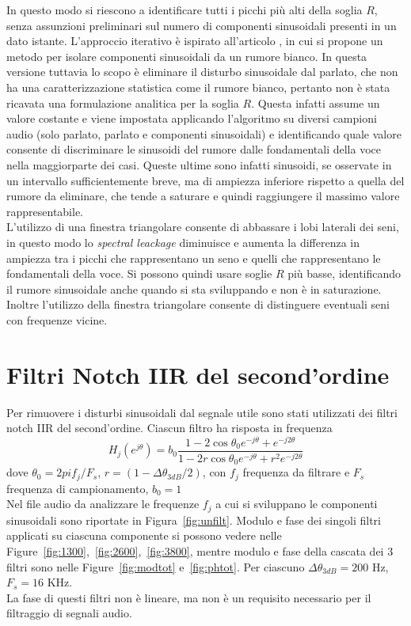 \documentclass[10pt,A4]{article}
\begin{document}
In questo modo si riescono a identificare tutti i picchi più alti della soglia $R$, senza assunzioni preliminari sul numero di componenti sinusoidali presenti in un dato istante. L'approccio iterativo è ispirato all'articolo \cite{iterative}, in cui si propone un metodo per isolare componenti sinusoidali da un rumore bianco. In questa versione tuttavia lo scopo è eliminare il disturbo sinusoidale dal parlato, che non ha una caratterizzazione statistica come il rumore bianco, pertanto non è stata ricavata una formulazione analitica per la soglia $R$. Questa infatti assume un valore costante e viene impostata applicando l'algoritmo su diversi campioni audio (solo parlato, parlato e componenti sinusoidali) e identificando quale valore consente di discriminare le sinusoidi del rumore dalle fondamentali della voce nella maggiorparte dei casi. Queste ultime sono infatti sinusoidi, se osservate in un intervallo sufficientemente breve, ma di ampiezza inferiore rispetto a quella del rumore da eliminare, che tende a saturare e quindi raggiungere il massimo valore rappresentabile. \\
L'utilizzo di una finestra triangolare consente di abbassare i lobi laterali dei seni, in questo modo lo \textit{spectral leackage} diminuisce e aumenta la differenza in ampiezza tra i picchi che rappresentano un seno e quelli che rappresentano le fondamentali della voce. Si possono quindi usare soglie $R$ più basse, identificando il rumore sinusoidale anche quando si sta sviluppando e non è in saturazione. Inoltre l'utilizzo della finestra triangolare consente di distinguere eventuali seni con frequenze vicine. \\


\section{Filtri Notch IIR del second'ordine}
Per rimuovere i disturbi sinusoidali dal segnale utile sono stati utilizzati dei filtri notch IIR del second'ordine.
Ciascun filtro ha risposta in frequenza
\begin{equation}
  H_j(e^{j\theta}) = b_0 \frac{1 - 2\cos\theta_0 e^{-j\theta} + e^{-j2\theta}}{1 - 2 r \cos\theta_0 e^{-j\theta} + r^2 e^{-j2\theta}}
\end{equation}
dove $\theta_0 = 2pif_j/F_s$, $r = (1 - \Delta\theta_{3dB} / 2)$, con $f_j$ frequenza da filtrare e $F_s$ frequenza di campionamento, $b_0 = 1$ \\
Nel file audio da analizzare le frequenze $f_j$ a cui si sviluppano le componenti sinusoidali sono riportate in Figura~\ref{fig:unfilt}. Modulo e fase dei singoli filtri applicati su ciascuna componente si possono vedere nelle Figure~\ref{fig:1300},~\ref{fig:2600},~\ref{fig:3800}, mentre modulo e fase della cascata dei 3 filtri sono nelle Figure~\ref{fig:modtot} e~\ref{fig:phtot}. Per ciascuno $ \Delta\theta_{3dB} = 200 $ Hz, $ F_s = 16 $ KHz. \\
La fase di questi filtri non è lineare, ma non è un requisito necessario per il filtraggio di segnali audio. \\
\end{document}
